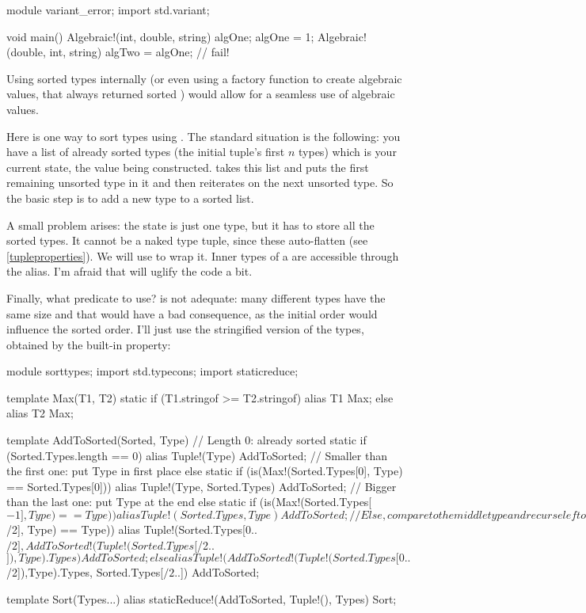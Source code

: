 \begin{dcode}
module variant_error;
import std.variant;

void main()
{
    Algebraic!(int, double, string) algOne;
    algOne = 1;
    Algebraic!(double, int, string) algTwo = algOne; // fail!
}
\end{dcode}

Using sorted types internally (or even using a factory function to create algebraic values, that always returned sorted ) would allow for a seamless use of algebraic values.

Here is one way to sort types using . The standard situation is the following: you have a list of already sorted types (the initial tuple's first $n$ types) which is your current state, the value being constructed.  takes this list and puts the first remaining unsorted type in it and then reiterates on the next unsorted type. So the basic step is to add a new type to a sorted list. 

A small problem arises: the state is just one type, but it has to store all the sorted types. It cannot be a naked type tuple, since these auto-flatten (see \ref{tupleproperties}). We will use  to wrap it. Inner types of a  are accessible through the  alias. I'm afraid that will uglify the code a bit.

Finally, what predicate to use?  is not adequate: many different types have the same size and that would have a bad consequence, as the initial order would influence the sorted order. I'll just use the stringified version of the types, obtained by the built-in  property:


\begin{dcode}
module sorttypes;
import std.typecons;
import staticreduce;

template Max(T1, T2)
{
    static if (T1.stringof >= T2.stringof)
        alias T1 Max;
    else
        alias T2 Max;
}

template AddToSorted(Sorted, Type)
{
// Length 0: already sorted
    static if (Sorted.Types.length == 0)
        alias Tuple!(Type) AddToSorted;
// Smaller than the first one: put Type in first place
    else static if (is(Max!(Sorted.Types[0], Type) == Sorted.Types[0]))
        alias Tuple!(Type, Sorted.Types) AddToSorted;
// Bigger than the last one: put Type at the end
    else static if (is(Max!(Sorted.Types[$-1], Type) == Type))
        alias Tuple!(Sorted.Types, Type) AddToSorted;
// Else, compare to the middle type and recurse left or right of it
    else static if (is(Max!(Sorted.Types[$/2], Type) == Type))
        alias Tuple!(Sorted.Types[0..$/2],
                     AddToSorted!(Tuple!(Sorted.Types[$/2..$]),Type).Types)
              AddToSorted;
    else
        alias Tuple!(AddToSorted!(Tuple!(Sorted.Types[0..$/2]),Type).Types,
                     Sorted.Types[$/2..$])
              AddToSorted;    
}

template Sort(Types...)
{
    alias staticReduce!(AddToSorted, Tuple!(), Types) Sort;
}
\end{dcode}

